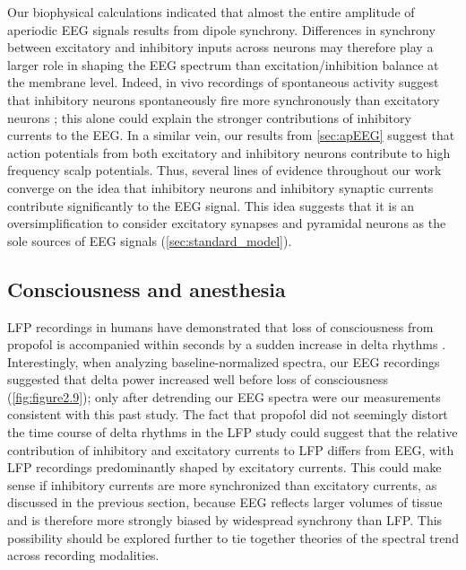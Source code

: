 Our biophysical calculations indicated that almost the entire amplitude of aperiodic EEG signals results from dipole synchrony. Differences in synchrony between excitatory and inhibitory inputs across neurons may therefore play a larger role in shaping the EEG spectrum than excitation/inhibition balance at the membrane level. Indeed, in vivo recordings of spontaneous activity suggest that inhibitory neurons spontaneously fire more synchronously than excitatory neurons \cite{Gentet2010}; this alone could explain the stronger contributions of inhibitory currents to the EEG. In a similar vein, our results from \autoref{sec:apEEG} suggest that action potentials from both excitatory and inhibitory neurons contribute to high frequency scalp potentials. Thus, several lines of evidence throughout our work converge on the idea that inhibitory neurons and inhibitory synaptic currents contribute significantly to the EEG signal. This idea suggests that it is an oversimplification to consider excitatory synapses and pyramidal neurons as the sole sources of EEG signals (\autoref{sec:standard_model}).

\subsection{Consciousness and anesthesia} \label{sec:anesthesia}
LFP recordings in humans have demonstrated that loss of consciousness from propofol is accompanied within seconds by a sudden increase in delta rhythms \cite{Lewis2012}. Interestingly, when analyzing baseline-normalized spectra, our EEG recordings suggested that delta power increased well before loss of consciousness (\autoref{fig:figure2.9}); only after detrending our EEG spectra were our measurements consistent with this past study. The fact that propofol did not seemingly distort the time course of delta rhythms in the LFP study \cite{Lewis2012} could suggest that the relative contribution of inhibitory and excitatory currents to LFP differs from EEG, with LFP recordings predominantly shaped by excitatory currents. This could make sense if inhibitory currents are more synchronized than excitatory currents, as discussed in the previous section, because EEG reflects larger volumes of tissue and is therefore more strongly biased by widespread synchrony than LFP. This possibility should be explored further to tie together theories of the spectral trend across recording modalities. 


